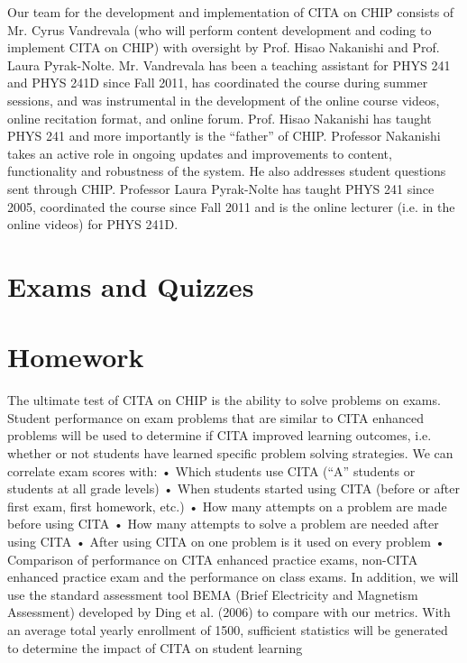 Our team for the development and implementation of CITA on CHIP consists of Mr. Cyrus
Vandrevala (who will perform content development and coding to implement CITA on CHIP)
with oversight by Prof. Hisao Nakanishi and Prof. Laura Pyrak-Nolte. Mr. Vandrevala has been
a teaching assistant for PHYS 241 and PHYS 241D since Fall 2011, has coordinated the course
during summer sessions, and was instrumental in the development of the online course videos,
online recitation format, and online forum. Prof. Hisao Nakanishi has taught PHYS 241 and
more importantly is the “father” of CHIP. Professor Nakanishi takes an active role in ongoing
updates and improvements to content, functionality and robustness of the system. He also
addresses student questions sent through CHIP. Professor Laura Pyrak-Nolte has taught PHYS
241 since 2005, coordinated the course since Fall 2011 and is the online lecturer (i.e. in the
online videos) for PHYS 241D.

\section{Exams and Quizzes}



\section{Homework}

The ultimate test of CITA on CHIP is the ability to solve problems on exams. Student
performance on exam problems that are similar to CITA enhanced problems will be used to
determine if CITA improved learning outcomes, i.e. whether or not students have learned
specific problem solving strategies. We can correlate exam scores with:
• Which students use CITA (“A” students or students at all grade levels)
• When students started using CITA (before or after first exam, first homework, etc.)
• How many attempts on a problem are made before using CITA
• How many attempts to solve a problem are needed after using CITA
• After using CITA on one problem is it used on every problem
• Comparison of performance on CITA enhanced practice exams, non-CITA enhanced
practice exam and the performance on class exams.
In addition, we will use the standard assessment tool BEMA (Brief Electricity and Magnetism
Assessment) developed by Ding et al. (2006) to compare with our metrics. With an average total
yearly enrollment of 1500, sufficient statistics will be generated to determine the impact of CITA
on student learning

